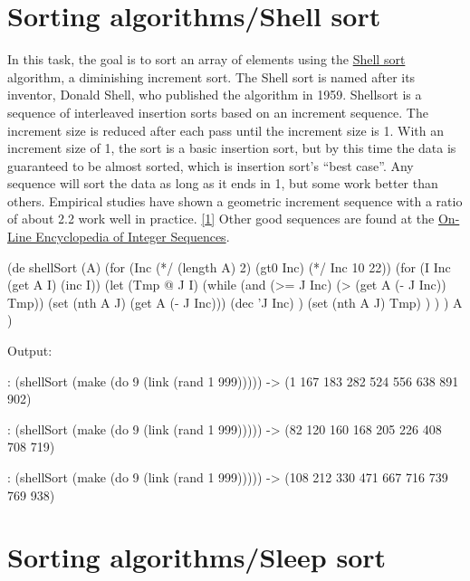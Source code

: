 \begin{itemize}
\begin{wideverbatim}
\end{wideverbatim}

\pagebreak{}
\section*{Sorting algorithms/Shell sort}

In this task, the goal is to sort an array of elements using the
\href{http://en.wikipedia.org/wiki/Shell\_sort}{Shell sort} algorithm, a
diminishing increment sort. The Shell sort is named after its inventor,
Donald Shell, who published the algorithm in 1959. Shellsort is a
sequence of interleaved insertion sorts based on an increment sequence.
The increment size is reduced after each pass until the increment size
is 1. With an increment size of 1, the sort is a basic insertion sort,
but by this time the data is guaranteed to be almost sorted, which is
insertion sort's ``best case''. Any sequence will sort the data as long
as it ends in 1, but some work better than others. Empirical studies
have shown a geometric increment sequence with a ratio of about 2.2 work
well in practice. \href{http://www.cs.princeton.edu/~rs/shell/}{{[}1{]}}
Other good sequences are found at the
\href{https://oeis.org/search?q=shell+sort}{On-Line Encyclopedia of
Integer Sequences}.

\begin{wideverbatim}

(de shellSort (A)
   (for (Inc (*/ (length A) 2)  (gt0 Inc)  (*/ Inc 10 22))
      (for (I Inc  (get A I)  (inc I))
         (let (Tmp @  J I)
            (while (and (>= J Inc) (> (get A (- J Inc)) Tmp))
               (set (nth A J) (get A (- J Inc)))
               (dec 'J Inc) )
            (set (nth A J) Tmp) ) ) )
   A )

Output:

: (shellSort (make (do 9 (link (rand 1 999)))))
-> (1 167 183 282 524 556 638 891 902)

: (shellSort (make (do 9 (link (rand 1 999)))))
-> (82 120 160 168 205 226 408 708 719)

: (shellSort (make (do 9 (link (rand 1 999)))))
-> (108 212 330 471 667 716 739 769 938)

\end{wideverbatim}

\pagebreak{}
\section*{Sorting algorithms/Sleep sort}


\end{itemize}
